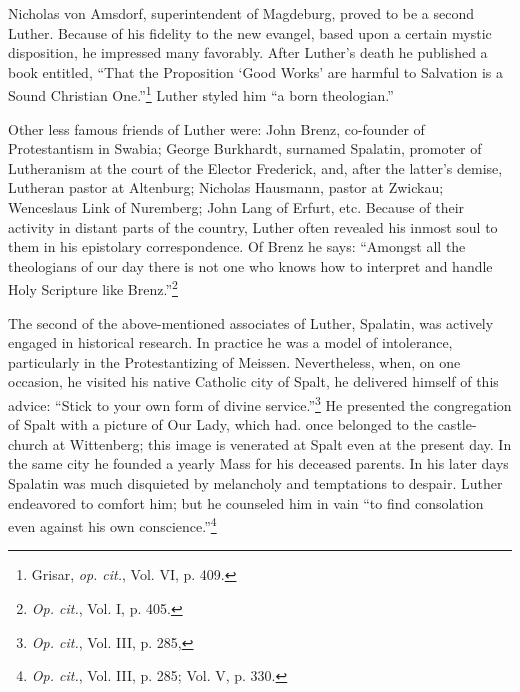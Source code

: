 Nicholas von Amsdorf, superintendent of Magdeburg, proved to
be a second Luther. Because of his fidelity to the new evangel, based
upon a certain mystic disposition, he impressed many favorably.
After Luther’s death he published a book entitled, “That the Proposition
‘Good Works’ are harmful to Salvation is a Sound Christian
One.”\footnote{Grisar, \textit{op. cit.}, Vol. VI, p. 409.}
 Luther styled him “a born theologian.”

Other less famous friends of Luther were: John Brenz, co-founder
of Protestantism in Swabia; George Burkhardt, surnamed Spalatin,
promoter of Lutheranism at the court of the Elector Frederick, and,
after the latter’s demise, Lutheran pastor at Altenburg; Nicholas
Hausmann, pastor at Zwickau; Wenceslaus Link of Nuremberg;
John Lang of Erfurt, etc. Because of their activity in distant parts of
the country, Luther often revealed his inmost soul to them in his
epistolary correspondence. Of Brenz he says: “Amongst all the theologians
of our day there is not one who knows how to interpret and
handle Holy Scripture like Brenz.”\footnote{\textit{Op. cit.}, Vol. I, p. 405.}

The second of the above-mentioned associates of Luther, Spalatin,
was actively engaged in historical research. In practice he was
a model of intolerance, particularly in the Protestantizing of
Meissen. Nevertheless, when, on one occasion, he visited his native
Catholic city of Spalt, he delivered himself of this advice: “Stick
to your own form of divine service.”\footnote{\textit{Op. cit.}, Vol. III, p. 285,}
He presented the congregation
of Spalt with a picture of Our Lady, which had. once belonged
to the castle-church at Wittenberg; this image is venerated at Spalt
even at the present day. In the same city he founded a yearly Mass for
his deceased parents. In his later days Spalatin was much disquieted
by melancholy and temptations to despair. Luther endeavored to
comfort him; but he counseled him in vain “to find consolation even
against his own conscience.”\footnote{\textit{Op. cit.}, Vol. III, p. 285; Vol. V, p. 330.}

